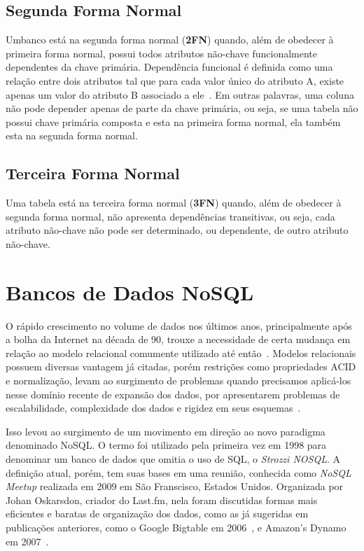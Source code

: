 \subsection*{Segunda Forma Normal}
Umbanco está na segunda forma normal (\textbf{2FN}) quando, além de obedecer à primeira forma normal, possui todos atributos não-chave funcionalmente dependentes da chave primária. Dependência funcional é definida como uma relação entre dois atributos tal que para cada valor único do atributo A, existe apenas um valor do atributo B associado a ele~\cite{jan}. Em outras palavras, uma coluna não pode depender apenas de parte da chave primária, ou seja, se uma tabela não possui chave primária composta e esta na primeira forma normal, ela também esta na segunda forma normal.

\subsection*{Terceira Forma Normal}
Uma tabela está na terceira forma normal (\textbf{3FN}) quando, além de obedecer à segunda forma normal, não apresenta dependências transitivas, ou seja, cada atributo não-chave não pode ser determinado, ou dependente, de outro atributo não-chave. 

\section{Bancos de Dados NoSQL}
O rápido crescimento no volume de dados nos últimos anos, principalmente após a bolha da Internet na década de 90, trouxe a necessidade de certa mudança em relação ao modelo relacional comumente utilizado até então~\cite{pramod}. Modelos relacionais possuem diversas vantagem já citadas, porém restrições como propriedades ACID e normalização, levam ao surgimento de problemas quando precisamos aplicá-los nesse domínio recente de expansão dos dados, por apresentarem problemas de escalabilidade, complexidade dos dados e rigidez em seus esquemas~\cite{leavitt2010nosql}. 

Isso levou ao surgimento de um movimento em direção ao novo paradigma denominado NoSQL. O termo foi utilizado pela primeira vez em 1998 para denominar um banco de dados que omitia o uso de SQL, o \emph{Strozzi NOSQL}. A definição atual, porém, tem suas bases em uma reunião, conhecida como \emph{NoSQL Meetup} realizada em 2009 em São Franscisco, Estados Unidos. Organizada por Johan Oskarsdon, criador do Last.fm, nela foram discutidas formas mais eficientes e baratas de organização dos dados, como as já sugeridas em publicações anteriores, como o Google Bigtable em 2006~\cite{bigtable}, e Amazon's Dynamo em 2007~\cite{dynamo, chrisnosql}.
